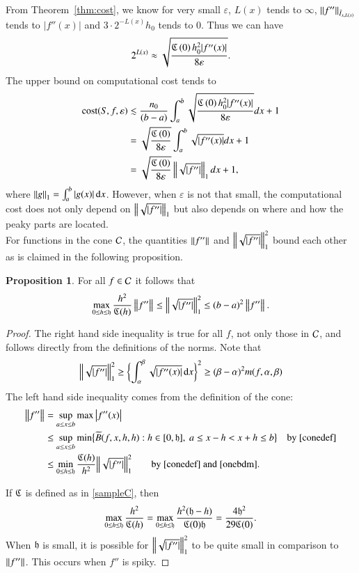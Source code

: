 \documentclass[review]{elsarticle}
\theoremstyle{definition}
\newtheorem{prop}[theorem]{Proposition}
\begin{document}
From Theorem~\ref{thm:cost}, we know for very small $\varepsilon$,
$L(x)$ tends to $\infty$, $ \norm[\bar{I}_{x,L(x)}]{f''} $ tends to $|f''(x)|$ and $3\cdot 2^{-L(x)}h_0$ tends to 0.
Thus we can have
$$ 2^{L(x)} \approx \sqrt{\frac{\fC\left(0\right)  h_0^2 |f''(x)|}{8\varepsilon}}.$$
The upper bound on computational cost tends to
\begin{align*}
\cost(S,f,\varepsilon)  & \lesssim \frac{n_0}{(b-a)}\int_a^b \sqrt{\frac{\fC\left(0\right)  h_0^2 |f''(x)|}{8\varepsilon}} dx +1 \\
& =\sqrt{\frac{\fC\left(0\right)}{8\varepsilon}}\int_a^b \sqrt{|f''(x)|} dx +1\\
& =\sqrt{\frac{\fC\left(0\right)}{8\varepsilon}}\norm[1]{\sqrt{|f''|}} dx +1,
\end{align*}
where $\norm[1]{g}=\int_a^b |g(x)| \, \dif x$.
However, when $\varepsilon$ is not that small, the computational cost does not only depend on $\norm[1]{\sqrt{|f''|}}$ but also depends on where and how the peaky parts are located.\\

For functions in the cone $\cc$, the quantities $\norm{f''}$ and $\Bignorm[1]{\sqrt{\abs{f''}}}^2$ bound each other as is claimed in the following proposition.

\begin{prop} For all $f \in \cc$ it follows that
\begin{equation}
\max_{0 \le h \le \fh} \frac{h^2}{\fC(h)} \norm{f''} \le \Bignorm[1]{\sqrt{\abs{f''}}}^2 \le (b-a)^2 \norm{f''}.
\end{equation}
\end{prop}
\begin{proof}
The right hand side inequality is true for all $f$, not only those in $\cc$, and follows directly from the definitions of the norms.  Note that
\begin{equation} \label{onebdm}
\Bignorm[1]{\sqrt{\abs{f''}}}^2 \ge \biggl\{ \int_{\alpha}^{\beta} \sqrt{\abs{f''(x)}} \, \dif x \biggr\}^2 \ge  (\beta - \alpha)^2 m(f,\alpha,\beta)
\end{equation}
The left hand side inequality comes from the definition of the cone:
\begin{align*}
\norm{f''} & = \sup_{a \le x \le b} \max \abs{f''(x)} \\
& \le \sup_{a \le x \le b} \min\bigl\{\tB(f,x,h,h) : h \in [0,\fh], \ a \le x - h < x+h \le b \bigr \} \quad \text{by } \eqref{conedef} \\
& \le \min_{0 \le h \le \fh} \frac{\fC(h)}{h^2} \Bignorm[1]{\sqrt{\abs{f''}}}^2 \qquad \text{by } \eqref{conedef} \text{ and } \eqref{onebdm}.
\end{align*}

If $\fC$ is defined as in \eqref{sampleC}, then
\[
\max_{0 \le h \le \fh} \frac{h^2}{\fC(h)} = \max_{0 \le h \le \fh} \frac{h^2(\fh - h)}{\fC(0)\fh} = \frac{4\fh^2}{29\fC(0)}.
\]
When $\fh$ is small, it is possible for $\Bignorm[1]{\sqrt{\abs{f''}}}^2$ to be quite small in comparison to $\norm{f''}$.  This occurs when $f''$ is spiky. 
\end{proof}
\end{document}
